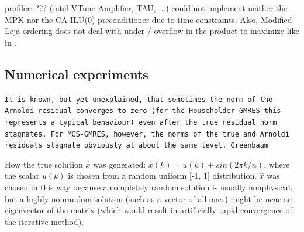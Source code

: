 \documentclass{scrartcl}
\numberwithin{equation}{section}
\begin{document}
 profiler: ??? (intel VTune Amplifier, TAU, $\ldots$) could not implement neither the MPK nor the CA-ILU(0) preconditioner due to time constraints. Also, Modified Leja ordering does not deal with under / overflow in the product to maximize like in \cite{Hoemmen:2010:CKS:1970638}.
\subsection{Numerical experiments}
\texttt{It is known, but yet unexplained, that sometimes the norm of the Arnoldi residual converges to zero (for the Householder-GMRES this represents a typical behaviour) even after the true residual norm stagnates. For MGS-GMRES, however, the norms of the true and Arnoldi residuals stagnate obviously at about the same level. Greenbaum~\cite{Greenbaum97numericalbehaviour}}

How the true solution $\hat{x}$ was generated: $\hat{x}(k) = u(k) + sin(2\pi k/n)$,
where the scalar $u(k)$ is chosen from a random uniform [-1, 1] distribution. 
$\hat{x}$ was chosen in this way because a completely random solution is usually nonphysical, but a highly nonrandom solution (such as a vector of all ones) might be near an eigenvector of the matrix (which would result in artificially rapid convergence of the iterative method).
\end{document}

